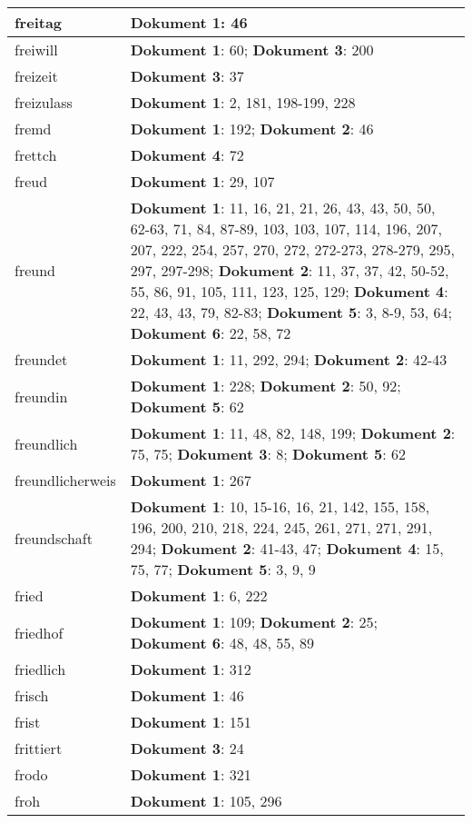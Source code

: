 \documentclass[a5paper]{article}
\begin{document}
\begin{longtable}[l]{|l|p{3in}|}
\hline
freitag & \textbf{Dokument 1}: 46 \\
\hline
freiwill & \textbf{Dokument 1}: 60; \textbf{Dokument 3}: 200 \\
\hline
freizeit & \textbf{Dokument 3}: 37 \\
\hline
freizulass & \textbf{Dokument 1}: 2, 181, 198-199, 228 \\
\hline
fremd & \textbf{Dokument 1}: 192; \textbf{Dokument 2}: 46 \\
\hline
frettch & \textbf{Dokument 4}: 72 \\
\hline
freud & \textbf{Dokument 1}: 29, 107 \\
\hline
freund & \textbf{Dokument 1}: 11, 16, 21, 21, 26, 43, 43, 50, 50, 62-63, 71, 84, 87-89, 103, 103, 107, 114, 196, 207, 207, 222, 254, 257, 270, 272, 272-273, 278-279, 295, 297, 297-298; \textbf{Dokument 2}: 11, 37, 37, 42, 50-52, 55, 86, 91, 105, 111, 123, 125, 129; \textbf{Dokument 4}: 22, 43, 43, 79, 82-83; \textbf{Dokument 5}: 3, 8-9, 53, 64; \textbf{Dokument 6}: 22, 58, 72 \\
\hline
freundet & \textbf{Dokument 1}: 11, 292, 294; \textbf{Dokument 2}: 42-43 \\
\hline
freundin & \textbf{Dokument 1}: 228; \textbf{Dokument 2}: 50, 92; \textbf{Dokument 5}: 62 \\
\hline
freundlich & \textbf{Dokument 1}: 11, 48, 82, 148, 199; \textbf{Dokument 2}: 75, 75; \textbf{Dokument 3}: 8; \textbf{Dokument 5}: 62 \\
\hline
freundlicherweis & \textbf{Dokument 1}: 267 \\
\hline
freundschaft & \textbf{Dokument 1}: 10, 15-16, 16, 21, 142, 155, 158, 196, 200, 210, 218, 224, 245, 261, 271, 271, 291, 294; \textbf{Dokument 2}: 41-43, 47; \textbf{Dokument 4}: 15, 75, 77; \textbf{Dokument 5}: 3, 9, 9 \\
\hline
fried & \textbf{Dokument 1}: 6, 222 \\
\hline
friedhof & \textbf{Dokument 1}: 109; \textbf{Dokument 2}: 25; \textbf{Dokument 6}: 48, 48, 55, 89 \\
\hline
friedlich & \textbf{Dokument 1}: 312 \\
\hline
frisch & \textbf{Dokument 1}: 46 \\
\hline
frist & \textbf{Dokument 1}: 151 \\
\hline
frittiert & \textbf{Dokument 3}: 24 \\
\hline
frodo & \textbf{Dokument 1}: 321 \\
\hline
froh & \textbf{Dokument 1}: 105, 296 \\

\end{longtable}
\end{document}
